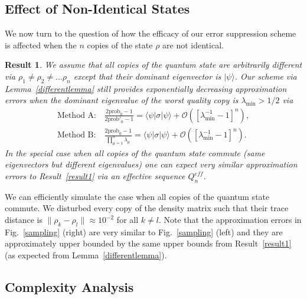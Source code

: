 \documentclass[aps,prx,showpacs,twocolumn,reprint]{revtex4-2}
\newtheorem{result}{Result}
\newcommand{\prob}{\mathrm{prob}_0}
\begin{document}
\subsection{Effect of Non-Identical States}

We now turn to the question of
how the efficacy of our error suppression scheme is affected when the $n$
copies of the state $\rho$ are not identical.
\begin{result} \label{result2}
	We assume that all copies of the quantum state are arbitrarily different via
	$\rho_1 \neq \rho_2 \neq \dots \rho_n$ except that their dominant eigenvector
	is $| \psi \rangle$. Our scheme via Lemma~\ref{differentlemma}
	still provides exponentially decreasing approximation errors when the
	dominant eigenvalue of the worst quality copy is $\lambda_\mathrm{min}>1/2$
	via
	\begin{align}
	\text{Method A:}& \,   \frac{2\prob-1}{2\mathrm{prob'}_0-1} = \langle\psi |\sigma | \psi \rangle + \mathcal{O}([\lambda_\mathrm{min}^{-1}{-}1]^n),\\
	\text{Method B:} &\,  \frac{2\prob-1}{\prod_{\mu=1}^n \lambda_\mu} = \langle\psi |\sigma | \psi \rangle +\mathcal{O}([\lambda_\mathrm{min}^{-1}{-}1]^n).
	\end{align}
	In the special case when all copies of the quantum state commute
	(same eigenvectors but different eigenvalues) one can expect very similar approximation
	errors to Result~\ref{result1} via an effective sequence $Q_n^{eff}$.
\end{result}

We can efficiently simulate the case when all copies of the quantum state commute.
We disturbed every copy of the
density matrix such that their trace distance is $\lVert \rho_k -\rho_l \rVert \approx 10^{-2}$
for all $k\neq l$. Note that the approximation errors in Fig.~\ref{sampling} (right) are very similar
to Fig.~\ref{sampling} (left) and they are approximately upper bounded by the same upper bounds
from Result~\ref{result1} (as expected from Lemma~\ref{differentlemma}).



\subsection{Complexity Analysis}
\end{document}
